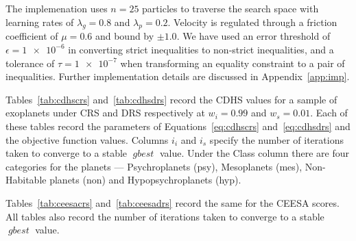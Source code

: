 \documentclass[10pt]{article}
\DeclareMathOperator*{\gbest}{\mathit{gbest}}
\begin{document}
The implemenation uses $n=25$ particles to traverse the search space with learning rates of $\lambda_g=0.8$ and
$\lambda_p=0.2$. Velocity is regulated through a friction coefficient of $\mu=0.6$ and bound by $\pm1.0$. We have used
an error threshold of $\epsilon=\num{1e-6}$ in converting strict inequalities to non-strict inequalities, and a
tolerance of $\tau=\num{1e-7}$ when transforming an equality constraint to a pair of inequalities. Further
implementation details are discussed in Appendix~\ref{app:imp}.

Tables~\ref{tab:cdhscrs} and~\ref{tab:cdhsdrs} record the CDHS values for a sample of exoplanets under CRS and DRS
respectively at $w_i=0.99$ and $w_s=0.01$. Each of these tables record the parameters of Equations~\ref{eq:cdhscrs}
and~\ref{eq:cdhsdrs} and the objective function values. Columns $i_i$ and $i_s$ specify the number of iterations taken
to converge to a stable $\gbest$ value. Under the Class column there are four categories for the planets ---
Psychroplanets (psy), Mesoplanets (mes), Non-Habitable planets (non) and Hypopsychroplanets (hyp).


Tables~\ref{tab:ceesacrs} and~\ref{tab:ceesadrs} record the same for the CEESA scores. All tables also
record the number of iterations taken to converge to a stable $\gbest$ value.
\end{document}

